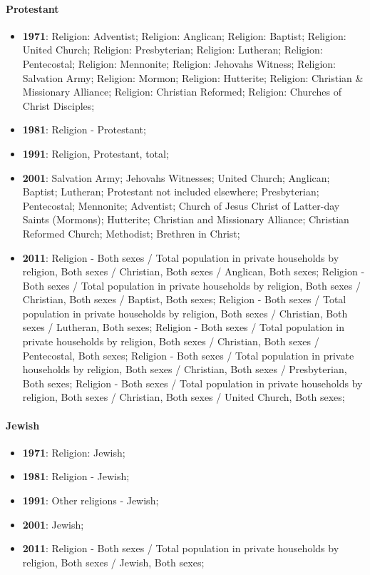 \documentclass[a4paper]{article}
\begin{document}
\paragraph{Protestant}
\begin{itemize}
   \item{\textbf{1971}:  Religion: Adventist; Religion: Anglican; Religion: Baptist; Religion: United Church; Religion: Presbyterian; Religion: Lutheran; Religion: Pentecostal; Religion: Mennonite; Religion: Jehovahs Witness; Religion: Salvation Army; Religion: Mormon; Religion: Hutterite; Religion: Christian \& Missionary Alliance; Religion: Christian Reformed; Religion: Churches of Christ Disciples;}
   \item{\textbf{1981}:  Religion - Protestant;}
   \item{\textbf{1991}:  Religion, Protestant, total;}
   \item{\textbf{2001}:  Salvation Army; Jehovahs Witnesses; United Church; Anglican; Baptist; Lutheran; Protestant not included elsewhere; Presbyterian; Pentecostal; Mennonite; Adventist; Church of Jesus Christ of Latter-day Saints (Mormons); Hutterite; Christian and Missionary Alliance; Christian Reformed Church; Methodist; Brethren in Christ;}
   \item{\textbf{2011}:  Religion - Both sexes / Total population in private households by religion, Both sexes / Christian, Both sexes / Anglican, Both sexes; Religion - Both sexes / Total population in private households by religion, Both sexes / Christian, Both sexes / Baptist, Both sexes; Religion - Both sexes / Total population in private households by religion, Both sexes / Christian, Both sexes / Lutheran, Both sexes; Religion - Both sexes / Total population in private households by religion, Both sexes / Christian, Both sexes / Pentecostal, Both sexes; Religion - Both sexes / Total population in private households by religion, Both sexes / Christian, Both sexes / Presbyterian, Both sexes; Religion - Both sexes / Total population in private households by religion, Both sexes / Christian, Both sexes / United Church, Both sexes;}
\end{itemize}

\paragraph{Jewish}
\begin{itemize}
   \item{\textbf{1971}:  Religion: Jewish;}
   \item{\textbf{1981}:  Religion - Jewish;}
   \item{\textbf{1991}:  Other religions - Jewish;}
   \item{\textbf{2001}:  Jewish;}
   \item{\textbf{2011}:  Religion - Both sexes / Total population in private households by religion, Both sexes / Jewish, Both sexes;}
\end{itemize}
\end{document}
